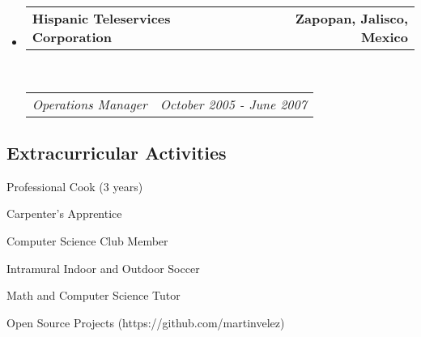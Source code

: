 \documentclass[10pt,letterpaper]{article}
\makeatletter
\newcommand{\headerrow}[2]
{\begin{tabular*}{\linewidth}{l@{\extracolsep{\fill}}r}
	#1 &
	#2 \\
\end{tabular*}}
\makeatother
\begin{document}
\begin{itemize}
	\item
	\headerrow
		{\textbf{Hispanic Teleservices Corporation}}
		{\textbf{Zapopan, Jalisco, Mexico}}
	\\
	\headerrow
		{\emph{Operations Manager}}
		{\emph{October 2005 - June 2007}}

\end{itemize}

\vspace{-0.4em}
\subsection*{Extracurricular Activities}

\begin{itemize*}
	\item Professional Cook (3 years)
	\item Carpenter's Apprentice
	\item Computer Science Club Member
	\item Intramural Indoor and Outdoor Soccer
	\item Math and Computer Science Tutor 
	\item Open Source Projects (https://github.com/martinvelez)
\end{itemize*}
\end{document}
